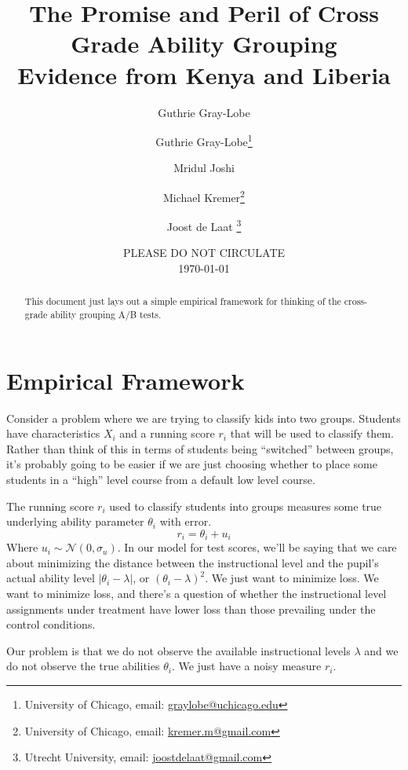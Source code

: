 \documentclass[10pt]{article}
\title{The Promise and Peril of Cross Grade Ability Grouping \\ Evidence from Kenya and Liberia}
\author{Guthrie Gray-Lobe}
\date{}
\begin{document}
\begin{titlepage}
\author{Guthrie Gray-Lobe\footnote{University of Chicago, email: \protect\href{mailto:graylobe@uchicago.edu }{graylobe@uchicago.edu}} \and Mridul Joshi \and Michael Kremer\footnote{University of Chicago, email: \protect\href{mailto:kremer.m@gmail.com}{kremer.m@gmail.com}} \and Joost de Laat \footnote{Utrecht University, email: \protect\href{mailto: joostdelaat@gmail.com}{joostdelaat@gmail.com}}}

\date{PLEASE DO NOT CIRCULATE \\ \today \\}
\maketitle

\begin{abstract}
This document just lays out a simple empirical framework for thinking of the cross-grade ability grouping A/B tests.
\end{abstract}
\setcounter{page}{0}
\thispagestyle{empty}
\end{titlepage}
\doublespacing

\section{Empirical Framework}

Consider a problem where we are trying to classify kids into two groups. Students have characteristics $X_i$ and a running score $r_i$ that will be used to classify them. Rather than think of this in terms of students being ``switched'' between groups, it's probably going to be easier if we are just choosing whether to place some students in a ``high'' level course from a default low level course. 

The running score $r_i$ used to classify students into groups measures some true underlying ability parameter $\theta_i$ with error. 
$$r_i = \theta_i + u_i$$
Where $u_i \sim \mathcal{N}(0,\sigma_u)$. In our model for test scores, we'll be saying that we care about minimizing the distance between the instructional level and the pupil's actual ability level $|\theta_i - \lambda|$, or $(\theta_i - \lambda)^2$. We just want to minimize loss. We want to minimize loss, and there's a question of whether the instructional level assignments under treatment have lower loss than those prevailing under the control conditions.

Our problem is that we do not observe the available instructional levels $\lambda$ and we do not observe the true abilities $\theta_i$. We just have a noisy measure $r_i$. 
\end{document}

